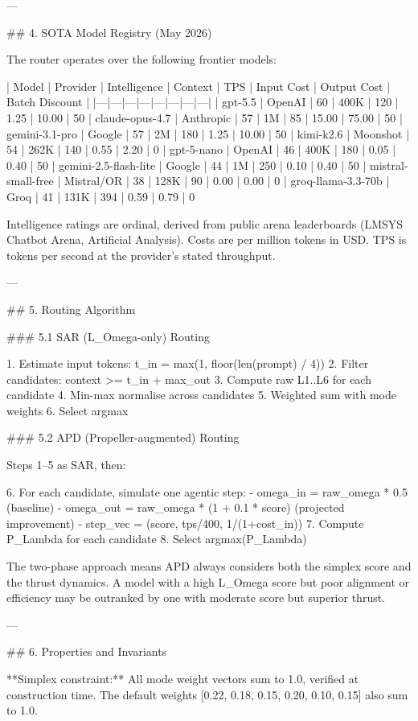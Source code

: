 ---

## 4. SOTA Model Registry (May 2026)

The router operates over the following frontier models:

| Model | Provider | Intelligence | Context | TPS | Input Cost | Output Cost | Batch Discount |
|---|---|---|---|---|---|---|---|
| gpt-5.5 | OpenAI | 60 | 400K | 120 | 1.25 | 10.00 | 50%
| claude-opus-4.7 | Anthropic | 57 | 1M | 85 | 15.00 | 75.00 | 50%
| gemini-3.1-pro | Google | 57 | 2M | 180 | 1.25 | 10.00 | 50%
| kimi-k2.6 | Moonshot | 54 | 262K | 140 | 0.55 | 2.20 | 0%
| gpt-5-nano | OpenAI | 46 | 400K | 180 | 0.05 | 0.40 | 50%
| gemini-2.5-flash-lite | Google | 44 | 1M | 250 | 0.10 | 0.40 | 50%
| mistral-small-free | Mistral/OR | 38 | 128K | 90 | 0.00 | 0.00 | 0%
| groq-llama-3.3-70b | Groq | 41 | 131K | 394 | 0.59 | 0.79 | 0%

Intelligence ratings are ordinal, derived from public arena leaderboards (LMSYS Chatbot Arena, Artificial Analysis). Costs are per million tokens in USD. TPS is tokens per second at the provider's stated throughput.

---

## 5. Routing Algorithm

### 5.1 SAR (L_Omega-only) Routing

1. Estimate input tokens: t_in = max(1, floor(len(prompt) / 4))
2. Filter candidates: context >= t_in + max_out
3. Compute raw L1..L6 for each candidate
4. Min-max normalise across candidates
5. Weighted sum with mode weights
6. Select argmax

### 5.2 APD (Propeller-augmented) Routing

Steps 1--5 as SAR, then:

6. For each candidate, simulate one agentic step:
   - omega_in = raw_omega * 0.5 (baseline)
   - omega_out = raw_omega * (1 + 0.1 * score) (projected improvement)
   - step_vec = (score, tps/400, 1/(1+cost_in))
7. Compute P_Lambda for each candidate
8. Select argmax(P_Lambda)

The two-phase approach means APD always considers both the simplex score and the thrust dynamics. A model with a high L_Omega score but poor alignment or efficiency may be outranked by one with moderate score but superior thrust.

---

## 6. Properties and Invariants

**Simplex constraint:** All mode weight vectors sum to 1.0, verified at construction time. The default weights [0.22, 0.18, 0.15, 0.20, 0.10, 0.15] also sum to 1.0.

